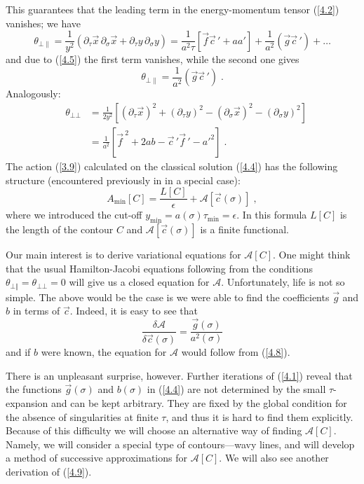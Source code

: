 \documentclass[a4paper,12pt]{article}
\numberwithin{equation}{section}
\newcommand{\dis}{\displaystyle}
\begin{document}
 This guarantees that the leading term in the energy-momentum tensor (\ref{4.2})
vanishes; we have
\[
\theta _{\bot \parallel }=\frac{1}{y^{2}}\left( \partial _{\tau }\vec{x}\, \partial _{\sigma }\vec{x}+\partial _{\tau }y\, \partial _{\sigma }y\right) =\frac{1}{a^{2}\tau }\left[ \vec{f}{\vec{c}\, }'+aa'\right] +\frac{1}{a^{2}}\left( \vec{g}{\vec{c}\, }'\right) +\ldots \]
 and due to (\ref{4.5}) the first term vanishes, while the second one gives
\[
\theta _{\bot \parallel }=\frac{1}{a^{2}}\left( \vec{g}{\vec{c}\, }'\right) \; .\]
 Analogously:
\begin{eqnarray}
 & \theta _{\bot \bot } & =\dis \frac{1}{2y^{2}}\left[ \left( \partial _{\tau }\vec{x}\right) ^{2}+\left( \partial _{\tau }y\right) ^{2}-\left( \partial _{\sigma }\vec{x}\right) ^{2}-\left( \partial _{\sigma }y\right) ^{2}\right] \nonumber \\
 &  & =\dis \frac{1}{a^{2}}\left[ {\vec{f}\, }^{2}+2ab-{\vec{c}\, }'\vec{f}\, '-{a'}^{2}\right] \; .\label{4.8} 
\end{eqnarray}
 The action (\ref{3.9}) calculated on the classical solution (\ref{4.4}) has
the following structure (encountered previously in \cite{13} in a special case):
\begin{equation}
\label{4.9}
A_{\min }[C]=\frac{L[C]}{\epsilon }+\mathcal{A}[\vec{c}(\sigma )]\; ,
\end{equation}
 where we introduced the cut-off \( y_{\min }=a(\sigma )\tau _{\min }=\epsilon  \).
In this formula \( L[C] \) is the length of the contour \( C \) and \( \mathcal{A}[\vec{c}(\sigma )] \)
is a finite functional.

Our main interest is to derive variational equations for \( \mathcal{A}[C] \).
One might think that the usual Hamilton-Jacobi equations following from the
conditions \( \theta _{\bot \Vert }=\theta _{\bot \bot }=0 \) will give us
a closed equation for \( \mathcal{A} \). Unfortunately, life is not so simple.
The above would be the case is we were able to find the coefficients \( \vec{g} \)
and \( b \) in terms of \( \vec{c} \). Indeed, it is easy to see that
\[
\frac{\delta \mathcal{A}}{\delta \vec{c}(\sigma )}=\frac{\vec{g}(\sigma )}{a^{2}(\sigma )}\]
 and if \( b \) were known, the equation for \( \mathcal{A} \) would follow
from (\ref{4.8}).

There is an unpleasant surprise, however. Further iterations of (\ref{4.1})
reveal that the functions \( \vec{g}(\sigma ) \) and \( b(\sigma ) \) in (\ref{4.4})
are not determined by the small \( \tau  \)-expansion and can be kept arbitrary.
They are fixed by the global condition for the absence of singularities at finite
\( \tau  \), and thus it is hard to find them explicitly. Because of this difficulty
we will choose an alternative way of finding \( \mathcal{A}[C] \). Namely,
we will consider a special type of contours---wavy lines, and will develop a
method of successive approximations for \( \mathcal{A}[C] \). We will also
see another derivation of (\ref{4.9}). 
\end{document}
